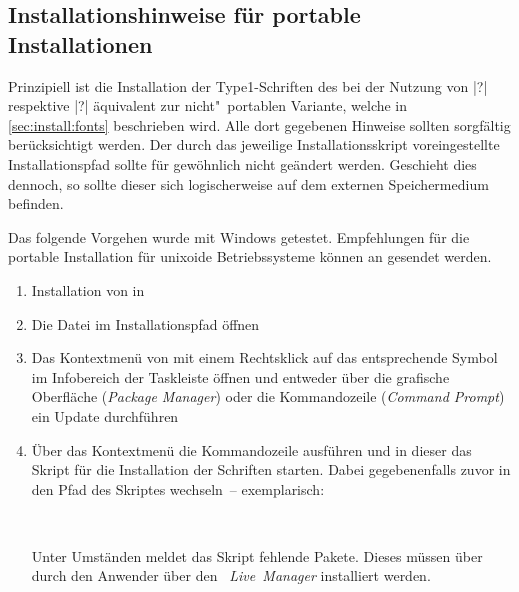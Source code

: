 \subsection{Installationshinweise für portable Installationen}
%
%
Prinzipiell ist die Installation der Type1-Schriften des \CDs bei der Nutzung 
von |?| respektive 
|?| äquivalent zur nicht"~portablen 
Variante, welche in \autoref{sec:install:fonts} beschrieben wird. Alle dort 
gegebenen Hinweise sollten sorgfältig berücksichtigt werden. Der durch das 
jeweilige Installationsskript voreingestellte Installationspfad sollte für 
gewöhnlich nicht geändert werden. Geschieht dies dennoch, so sollte dieser sich 
logischerweise auf dem externen Speichermedium   
 befinden.

Das folgende Vorgehen wurde mit Windows getestet. Empfehlungen für die portable 
Installation für unixoide Betriebssysteme können an \mailto{\tudscrmail} 
gesendet werden.
\begin{enumerate}
\item Installation von  in 
\item Die Datei  im Installationspfad öffnen
\item Das Kontextmenü von  mit einem 
  Rechtsklick auf das entsprechende Symbol im Infobereich der Taskleiste    
  öffnen und entweder über die grafische Oberfläche (\emph{Package Manager}) 
  oder die Kommandozeile (\emph{Command Prompt}) ein Update durchführen
\item Über das Kontextmenü die Kommandozeile ausführen und in dieser das Skript 
  für die Installation der Schriften  starten. 
  Dabei gegebenenfalls zuvor in den Pfad des Skriptes wechseln~-- exemplarisch:
  \begin{quoting}[leftmargin=1.5em,rightmargin=0pt]
  \newline%
  \,
  \end{quoting}
  Unter Umständen meldet das Skript fehlende Pakete. Dieses müssen über durch 
  den Anwender über den \emph{~Live~Manager} installiert werden.
\end{enumerate}

